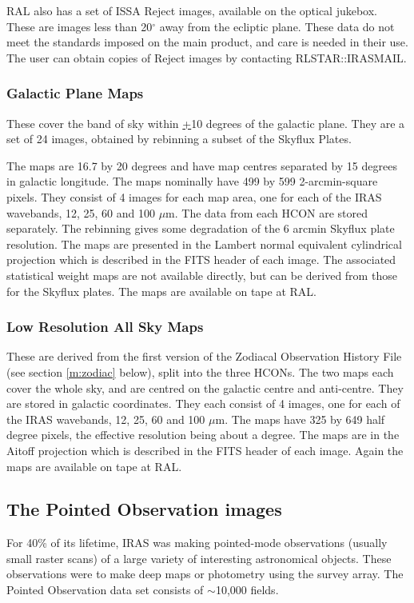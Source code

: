 RAL also has a set of ISSA Reject images, available on the optical jukebox.
These are images less than 20$^{\circ}$ away from the ecliptic plane. These
data do not meet the standards imposed on the main product, and care is needed
in their use. 
The user can obtain copies of Reject images by contacting RLSTAR::IRASMAIL.

\subsubsection{Galactic Plane Maps}
These cover the band of sky within \underline{+}10 degrees of the galactic 
plane. 
They are a set of 24 images, obtained by rebinning a subset of the Skyflux 
Plates.

The maps are 16.7 by 20 degrees and have map centres separated by 15 degrees in
galactic longitude.
The maps nominally have 499 by 599 2-arcmin-square pixels.
They consist of 4 images for each map area, one for each of the IRAS
wavebands, 12, 25, 60 and 100 $\mu$m. 
The data from each HCON are stored separately.
The rebinning gives some degradation of the 6 arcmin Skyflux plate resolution.
The maps are presented in the Lambert normal equivalent cylindrical projection
which is described in the FITS header of each image.
The associated statistical weight maps are not available directly, but can be
derived from those for the Skyflux plates.
The maps are available on tape at RAL.

\subsubsection{Low Resolution All Sky Maps}
These are derived from the first version of the Zodiacal Observation History
File (see section \ref{m:zodiac} below), split into the three HCONs.
The two maps each cover the whole sky, and are centred on the galactic centre 
and anti-centre. 
They are stored in galactic coordinates.
They each consist of 4 images, one for each of the IRAS wavebands, 12, 25, 
60 and 100 $\mu$m.
The maps have 325 by 649 half degree pixels, the effective resolution being
about a degree.
The maps are in the Aitoff projection which is described in the FITS header of
each image.
Again the maps are available on tape at RAL.

\subsection{The Pointed Observation images}
For 40\% of its lifetime, IRAS was making pointed-mode observations (usually 
small raster scans) of a large variety of interesting astronomical objects.
These observations were to make deep maps or photometry using the survey array.
The Pointed Observation data set consists of $\sim$10,000 fields.


